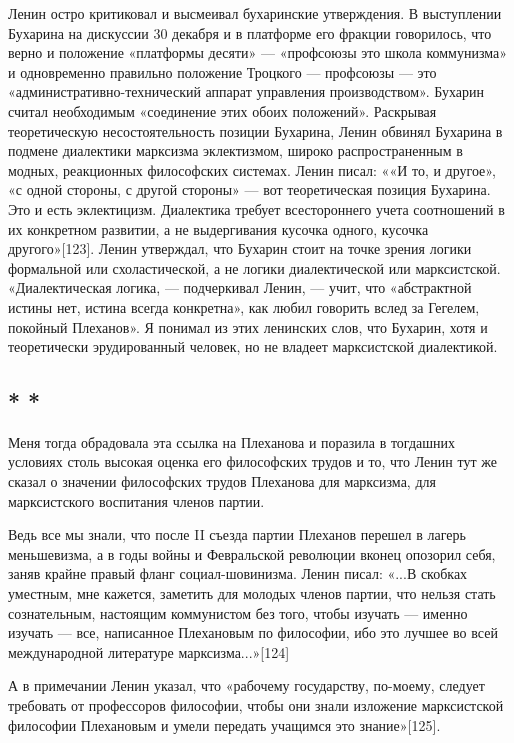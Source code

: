 \documentclass[12pt, a4paper, openany]{book}
\begin{document}
Ленин остро критиковал и высмеивал бухаринские утверждения. В выступлении Бухарина на дискуссии 30 декабря и в платформе его фракции говорилось, что верно и положение «платформы десяти» — «профсоюзы это школа коммунизма» и одновременно правильно положение Троцкого — профсоюзы — это «административно-технический аппарат управления производством». Бухарин считал необходимым «соединение этих обоих положений». Раскрывая теоретическую несостоятельность позиции Бухарина, Ленин обвинял Бухарина в подмене диалектики марксизма эклектизмом, широко распространенным в модных, реакционных философских системах. Ленин писал: ««И то, и другое», «с одной стороны, с другой стороны» — вот теоретическая позиция Бухарина. Это и есть эклектицизм. Диалектика требует всестороннего учета соотношений в их конкретном развитии, а не выдергивания кусочка одного, кусочка другого»[123]. Ленин утверждал, что Бухарин стоит на точке зрения логики формальной или схоластической, а не логики диалектической или марксистской. «Диалектическая логика, — подчеркивал Ленин, — учит, что «абстрактной истины нет, истина всегда конкретна», как любил говорить вслед за Гегелем, покойный Плеханов». Я понимал из этих ленинских слов, что Бухарин, хотя и теоретически эрудированный человек, но не владеет марксистской диалектикой.

\subsection*{\center * * *}

Меня тогда обрадовала эта ссылка на Плеханова и поразила в тогдашних условиях столь высокая оценка его философских трудов и то, что Ленин тут же сказал о значении философских трудов Плеханова для марксизма, для марксистского воспитания членов партии.

Ведь все мы знали, что после II съезда партии Плеханов перешел в лагерь меньшевизма, а в годы войны и Февральской революции вконец опозорил себя, заняв крайне правый фланг социал-шовинизма. Ленин писал: «...В скобках уместным, мне кажется, заметить для молодых членов партии, что нельзя стать сознательным, настоящим коммунистом без того, чтобы изучать — именно изучать — все, написанное Плехановым по философии, ибо это лучшее во всей международной литературе марксизма...»[124]

А в примечании Ленин указал, что «рабочему государству, по-моему, следует требовать от профессоров философии, чтобы они знали изложение марксистской философии Плехановым и умели передать учащимся это знание»[125].
\end{document}
